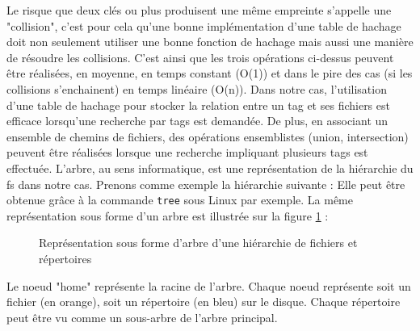 Le risque que deux clés ou plus produisent une même empreinte s'appelle une "collision", c'est 
pour cela qu'une bonne implémentation d'une table de hachage doit non seulement utiliser une bonne 
fonction de hachage mais aussi une manière de résoudre les collisions. C'est ainsi que les trois 
opérations ci-dessus peuvent être réalisées, en moyenne, en temps constant (O(1)) et dans le pire 
des cas (si les collisions s'enchainent) en temps linéaire (O(n)). Dans notre cas, l'utilisation 
d'une table de hachage pour stocker la relation entre un tag et ses fichiers est efficace lorsqu'une 
recherche par tags est demandée. De plus, en associant un ensemble de chemins de fichiers, 
des opérations ensemblistes (union, intersection) peuvent être réalisées lorsque une recherche 
impliquant plusieurs tags est effectuée.
\bigbreak
L'arbre, au sens informatique, est une représentation de la hiérarchie du \acrshort{fs} dans 
notre cas. Prenons comme exemple la hiérarchie suivante :
Elle peut être obtenue grâce à la commande \texttt{tree} sous Linux par exemple.
La même représentation sous forme d'un arbre est illustrée sur la figure \ref{tree} :
\begin{figure}
    \begin{center}
    \end{center}
    \caption{Représentation sous forme d'arbre d'une hiérarchie de fichiers et répertoires}
    \label{tree}
\end{figure}
Le noeud "home" représente la racine de l'arbre. Chaque noeud représente soit un fichier (en orange), soit 
un répertoire (en bleu) sur le disque. Chaque répertoire peut être vu comme un sous-arbre de l'arbre principal.
